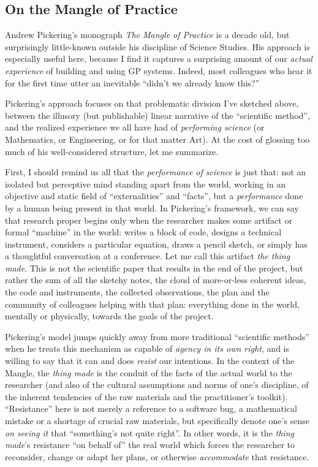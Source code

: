 \subsection{On the Mangle of Practice}\hypertarget{on-the-mangle-of-practice}{}\label{on-the-mangle-of-practice}

Andrew Pickering's monograph \emph{The Mangle of Practice} \citep{Pickering1995} is a decade old, but surprisingly little-known outside his discipline of Science Studies. His approach is especially useful here, because I find it captures a surprising amount of our \emph{actual experience} of building and using GP systems. Indeed, most colleagues who hear it for the first time utter an inevitable ``didn't we already know this?''

Pickering's approach focuses on that problematic division I've sketched above, between the illusory (but publishable) linear narrative of the ``scientific method'', and the realized experience we all have had of \emph{performing science} (or Mathematics, or Engineering, or for that matter Art). At the cost of glossing too much of his well-considered structure, let me summarize.

First, I should remind us all that the \emph{performance of science} is just that: not an isolated but perceptive mind standing apart from the world, working in an objective and static field of ``externalities'' and ``facts'', but a \emph{performance} done by a human being present in that world. In Pickering's  framework, we can say that research proper begins only when the researcher makes some artifact or formal ``machine'' in the world: writes a block of code, designs a technical instrument, considers a particular equation, draws a pencil sketch, or simply has a thoughtful conversation at a conference. Let me call this artifact \emph{the thing made}. This is not the scientific paper that results in the end of the project, but rather the sum of all the sketchy notes, the cloud of more-or-less coherent ideas, the code and instruments, the collected observations, the plan and the community of colleagues helping with that plan: everything done in the world, mentally or physically, towards the goals of the project.

Pickering's model jumps quickly away from more traditional ``scientific methods'' when he treats this mechanism as capable of \emph{agency in its own right}, and is willing to say that it can and does \emph{resist} our intentions. In the context of the Mangle, the \emph{thing made} is the conduit of the facts of the actual world to the researcher (and also of the cultural assumptions and norms of one's discipline, of the inherent tendencies of the raw materials and the practitioner's toolkit). ``Resistance'' here is not merely a reference to a software bug, a mathematical mistake or a shortage of crucial raw materials, but specifically denote one's sense \emph{on seeing it} that ``something's not quite right''. In other words, it is the \emph{thing made}'s resistance ``on behalf of'' the real world which forces the researcher to reconsider, change or adapt her plans, or otherwise \emph{accommodate} that resistance.

